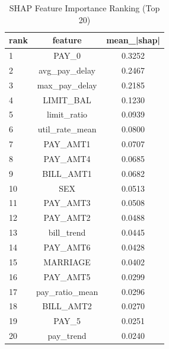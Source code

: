 \begin{table}
\centering
\caption{SHAP Feature Importance Ranking (Top 20)}
\label{tab:shap_ranking}
\begin{tabular}{lcc}
\toprule
rank & feature & mean_|shap| \\
\midrule
1 & PAY_0 & 0.3252 \\
2 & avg_pay_delay & 0.2467 \\
3 & max_pay_delay & 0.2185 \\
4 & LIMIT_BAL & 0.1230 \\
5 & limit_ratio & 0.0939 \\
6 & util_rate_mean & 0.0800 \\
7 & PAY_AMT1 & 0.0707 \\
8 & PAY_AMT4 & 0.0685 \\
9 & BILL_AMT1 & 0.0682 \\
10 & SEX & 0.0513 \\
11 & PAY_AMT3 & 0.0508 \\
12 & PAY_AMT2 & 0.0488 \\
13 & bill_trend & 0.0445 \\
14 & PAY_AMT6 & 0.0428 \\
15 & MARRIAGE & 0.0402 \\
16 & PAY_AMT5 & 0.0299 \\
17 & pay_ratio_mean & 0.0296 \\
18 & BILL_AMT2 & 0.0270 \\
19 & PAY_5 & 0.0251 \\
20 & pay_trend & 0.0240 \\
\bottomrule
\end{tabular}
\end{table}
